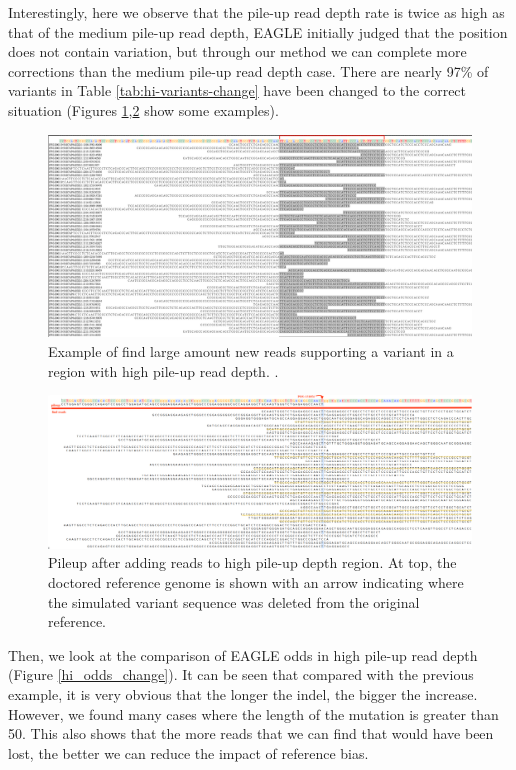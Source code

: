 Interestingly, here we observe that the pile-up read depth rate is twice as high as that of the medium pile-up read depth, EAGLE initially judged that the position does not contain variation, but through our method we can complete more corrections than the medium pile-up read depth case. There are nearly 97\% of variants in Table \ref{tab:hi-variants-change} have been changed to the correct situation (Figures \ref{hi_new_REFread},\ref{hi_pileup_REFread} show some examples).

\begin{figure}[H]
\includegraphics[width=1\columnwidth]{body/image/hi_new_REFread.png}
\caption[New reads in a region with high pile-up read depth]%
{Example of find large amount new reads supporting a variant in a region with high pile-up read depth.
\ExplainRedBracket.}
\label{hi_new_REFread}
\end{figure}

\begin{figure}[H]
\includegraphics[width=1\columnwidth]{body/image/hi_pileup_REFread.png}
\caption[variant pileup in high pile-up read depth]
{Pileup after adding reads to high pile-up depth region.
At top, the doctored reference genome is shown with an arrow indicating where the simulated variant sequence was deleted from the original reference.}
\label{hi_pileup_REFread}
\end{figure}

Then, we look at the comparison of EAGLE odds in high pile-up read depth (Figure \ref{hi_odds_change}). It can be seen that compared with the previous example, it is very obvious that the longer the indel, the bigger the increase. However, we found many cases where the length of the mutation is greater than 50. This also shows that the more reads that we can find that would have been lost, the better we can reduce the impact of reference bias.

